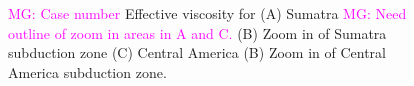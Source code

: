 \documentclass[12pt]{article}
\newcommand{\mgnote}[1]{\textcolor{magenta}{MG: #1}}
\begin{document}
\begin{figure}[H]
\centering

\hspace{-1.0cm}\subfigure{
}

\hspace{0.2cm}
\caption{\mgnote{ Case number}
Effective viscosity for (A) Sumatra \mgnote{Need outline of zoom in areas in A and C.} (B) Zoom in of Sumatra subduction zone (C) Central America (B) Zoom in of Central America subduction zone.}
\label{fig:visc_smaller}
\end{figure}
\end{document}
